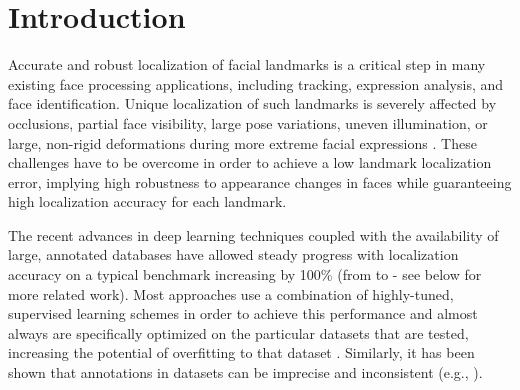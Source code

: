 \documentclass[10pt,twocolumn,letterpaper]{article}
\begin{document}
\vspace{-0.4cm}

\section{Introduction}\vspace{-0.2cm}

Accurate and robust localization of facial landmarks is a critical step in many existing face processing applications, including tracking, expression analysis, and face identification. Unique localization of such landmarks is severely affected by occlusions, partial face visibility, large pose variations, uneven illumination, or large, non-rigid deformations during more extreme facial expressions \cite{sagonas2013300,tresadern2011face}. These challenges have to be overcome in order to achieve a low landmark localization error, implying high robustness to appearance changes in faces while guaranteeing high localization accuracy for each landmark. 

The recent advances in deep learning techniques \cite{bodini2019review} coupled with the availability of large, annotated databases have allowed steady progress with localization accuracy on a typical benchmark increasing by 100\% (from \cite{xiong2013supervised} to \cite{Wu2018} - see below for more related work). Most approaches use a combination of highly-tuned, supervised learning schemes in order to achieve this performance and almost always are specifically optimized on the particular datasets that are tested, increasing the potential of overfitting to that dataset \cite{cawley2010over}. Similarly, it has been shown that annotations in datasets can be imprecise and inconsistent (e.g., \cite{Dong2018}).
\end{document}
